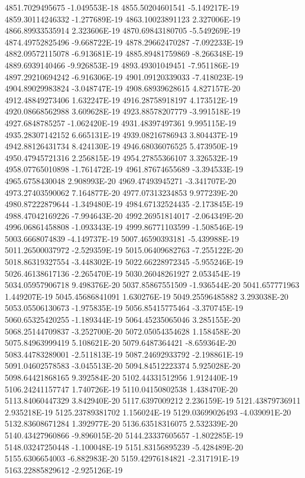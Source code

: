 4851.7029495675  -1.049553E-18
4855.50204601541  -5.149217E-19
4859.30114246332  -1.277689E-19
4863.10023891123  2.327006E-19
4866.89933535914  2.323606E-19
4870.69843180705  -5.549269E-19
4874.49752825496  -9.668722E-19
4878.29662470287  -7.092233E-19
4882.09572115078  -6.913681E-19
4885.89481759869  -8.266348E-19
4889.6939140466  -9.926853E-19
4893.49301049451  -7.951186E-19
4897.29210694242  -6.916306E-19
4901.09120339033  -7.418023E-19
4904.89029983824  -3.048747E-19
4908.68939628615  4.827157E-20
4912.48849273406  1.632247E-19
4916.28758918197  4.173512E-19
4920.08668562988  3.609628E-19
4923.88578207779  -3.991518E-19
4927.6848785257  -1.062420E-19
4931.48397497361  9.995115E-19
4935.28307142152  6.665131E-19
4939.08216786943  3.804437E-19
4942.88126431734  8.424130E-19
4946.68036076525  5.473950E-19
4950.47945721316  2.256815E-19
4954.27855366107  3.326532E-19
4958.07765010898  -1.761472E-19
4961.87674655689  -3.394533E-19
4965.6758430048  2.908993E-20
4969.47493945271  -3.341707E-20
4973.27403590062  7.164877E-20
4977.07313234853  9.977239E-20
4980.87222879644  -1.349480E-19
4984.67132524435  -2.173845E-19
4988.47042169226  -7.994643E-20
4992.26951814017  -2.064349E-20
4996.06861458808  -1.093343E-19
4999.86771103599  -1.508546E-19
5003.6668074839  -4.149737E-19
5007.46590393181  -5.439988E-19
5011.26500037972  -2.529359E-19
5015.06409682763  -7.255122E-20
5018.86319327554  -3.448302E-19
5022.66228972345  -5.955246E-19
5026.46138617136  -2.265470E-19
5030.26048261927  2.053454E-19
5034.05957906718  9.498376E-20
5037.85867551509  -1.936544E-20
5041.657771963  1.449207E-19
5045.45686841091  1.630276E-19
5049.25596485882  3.293038E-20
5053.05506130673  -1.975835E-19
5056.85415775464  -3.370745E-19
5060.65325420255  -1.189344E-19
5064.45235065046  3.285155E-20
5068.25144709837  -3.252700E-20
5072.05054354628  1.158458E-20
5075.84963999419  5.108621E-20
5079.6487364421  -8.659364E-20
5083.44783289001  -2.511813E-19
5087.24692933792  -2.198861E-19
5091.04602578583  -3.045513E-20
5094.84512223374  5.925028E-20
5098.64421868165  9.392584E-20
5102.44331512956  1.912440E-19
5106.24241157747  1.740726E-19
5110.04150802538  1.438470E-20
5113.84060447329  3.842940E-20
5117.6397009212  2.236159E-19
5121.43879736911  2.935218E-19
5125.23789381702  1.156024E-19
5129.03699026493  -4.039091E-20
5132.83608671284  1.392977E-20
5136.63518316075  2.532339E-20
5140.43427960866  -9.896015E-20
5144.23337605657  -1.802285E-19
5148.03247250448  -1.100048E-19
5151.83156895239  -5.428489E-20
5155.6306654003  -6.882983E-20
5159.42976184821  -2.317191E-19
5163.22885829612  -2.925126E-19
